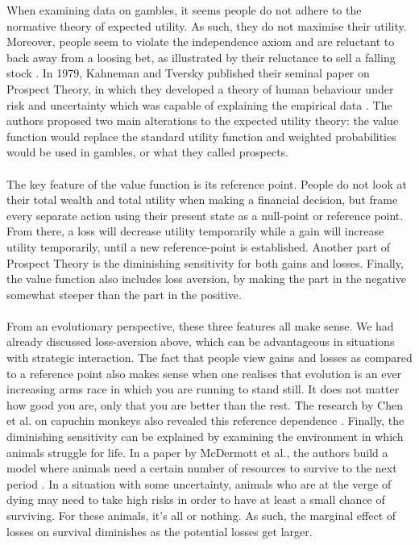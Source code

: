 \documentclass[a4paper,10pt]{article}
\numberwithin{equation}{section}
\begin{document}
When examining data on gambles, it seems people do not adhere to the normative theory of expected utility. As such, they do not maximise their utility. Moreover, people seem to violate the independence axiom and are reluctant to back away from a loosing bet, as illustrated by their reluctance to sell a falling stock \cite{Wilkinson2008}. In 1979, Kahneman and Tversky published their seminal paper on Prospect Theory, in which they developed a theory of human behaviour under risk and uncertainty which was capable of explaining the empirical data \cite{Kahneman1979}. The authors proposed two main alterations to the expected utility theory: the value function would replace the standard utility function and weighted probabilities would be used in gambles, or what they called prospects.\\
\\
The key feature of the value function is its reference point. People do not look at their total wealth and total utility when making a financial decision, but frame every separate action using their present state as a null-point or reference point. From there, a loss will decrease utility temporarily while a gain will increase utility temporarily, until a new reference-point is established. Another part of Prospect Theory is the diminishing sensitivity for both gains and losses. Finally, the value function also includes loss aversion, by making the part in the negative somewhat steeper than the part in the positive.\\
\\
From an evolutionary perspective, these three features all make sense. We had already discussed loss-aversion above, which can be advantageous in situations with strategic interaction. The fact that people view gains and losses as compared to a reference point also makes sense when one realises that evolution is an ever increasing arms race in which you are running to stand still. It does not matter how good you are, only that you are better than the rest. The research by Chen et al. on capuchin monkeys also revealed this reference dependence \cite{Chen2006}. Finally, the diminishing sensitivity can be explained by examining the environment in which animals struggle for life. In a paper by McDermott et al., the authors build a model where animals need a certain number of resources to survive to the next period \cite{McDermott2008}. In a situation with some uncertainty, animals who are at the verge of dying may need to take high risks in order to have at least a small chance of surviving. For these animals, it's all or nothing. As such, the marginal effect of losses on survival diminishes as the potential losses get larger.\\
\end{document}
